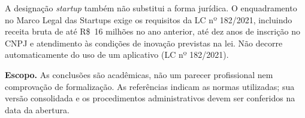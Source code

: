 A designação \emph{startup} também não substitui a forma jurídica. O enquadramento no Marco Legal das Startups exige os requisitos da LC nº 182/2021, incluindo receita bruta de até R\$~16 milhões no ano anterior, até dez anos de inscrição no CNPJ e atendimento às condições de inovação previstas na lei. Não decorre automaticamente do uso de um aplicativo (LC nº 182/2021).

\textbf{Escopo.} As conclusões são acadêmicas, não um parecer profissional nem comprovação de formalização. As referências indicam as normas utilizadas; sua versão consolidada e os procedimentos administrativos devem ser conferidos na data da abertura.